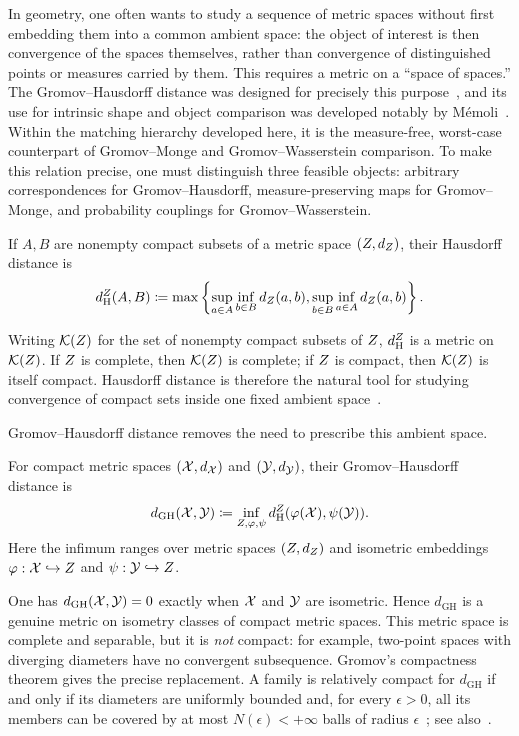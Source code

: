In geometry, one often wants to study a sequence of metric spaces without first embedding them into a common ambient space: the object of interest is then convergence of the spaces themselves, rather than convergence of distinguished points or measures carried by them. This requires a metric on a ``space of spaces.'' The Gromov--Hausdorff distance was designed for precisely this purpose~\cite{gromov-2001,burago2001course}, and its use for intrinsic shape and object comparison was developed notably by M\'emoli~\cite{memoli-2007}. Within the matching hierarchy developed here, it is the measure-free, worst-case counterpart of Gromov--Monge and Gromov--Wasserstein comparison. To make this relation precise, one must distinguish three feasible objects: arbitrary correspondences for Gromov--Hausdorff, measure-preserving maps for Gromov--Monge, and probability couplings for Gromov--Wasserstein.

\begin{defn}\label{def-hausdorff-distance}
If $A,B$ are nonempty compact subsets of a metric space $(Z,d_Z)$, their Hausdorff distance is
\[
	d_{\mathrm H}^{Z}(A,B)
	\coloneqq
	\max\left\{
		\sup_{a\in A}\inf_{b\in B}d_Z(a,b),
		\sup_{b\in B}\inf_{a\in A}d_Z(a,b)
	\right\}.
\]
\end{defn}
Writing $\mathcal K(Z)$ for the set of nonempty compact subsets of $Z$, $d_{\mathrm H}^{Z}$ is a metric on $\mathcal K(Z)$. If $Z$ is complete, then $\mathcal K(Z)$ is complete; if $Z$ is compact, then $\mathcal K(Z)$ is itself compact. Hausdorff distance is therefore the natural tool for studying convergence of compact sets inside one fixed ambient space~\cite[Section~7.3]{burago2001course}.

Gromov--Hausdorff distance removes the need to prescribe this ambient space.
\begin{defn}\label{def-gromov-hausdorff-distance}
For compact metric spaces $(\mathcal{X},d_{\mathcal{X}})$ and $(\mathcal{Y},d_{\mathcal{Y}})$, their Gromov--Hausdorff distance is
\[
d_{\mathrm{GH}}(\mathcal{X},\mathcal{Y})
\coloneqq
\inf_{Z,\varphi,\psi}
d_{\mathrm H}^{Z}(\varphi(\mathcal{X}),\psi(\mathcal{Y})).
\]
Here the infimum ranges over metric spaces $(Z,d_Z)$ and isometric embeddings $\varphi:\mathcal{X}\hookrightarrow Z$ and $\psi:\mathcal{Y}\hookrightarrow Z$.
\end{defn}
One has $d_{\mathrm{GH}}(\mathcal{X},\mathcal{Y})=0$ exactly when $\mathcal{X}$ and $\mathcal{Y}$ are isometric. Hence $d_{\mathrm{GH}}$ is a genuine metric on isometry classes of compact metric spaces. This metric space is complete and separable, but it is \emph{not} compact: for example, two-point spaces with diverging diameters have no convergent subsequence. Gromov's compactness theorem gives the precise replacement. A family is relatively compact for $d_{\mathrm{GH}}$ if and only if its diameters are uniformly bounded and, for every $\epsilon>0$, all its members can be covered by at most $N(\epsilon)<+\infty$ balls of radius $\epsilon$~\cite[Section~7.4]{burago2001course}; see also~\cite{gromov-2001,petersen1993gromov}.

